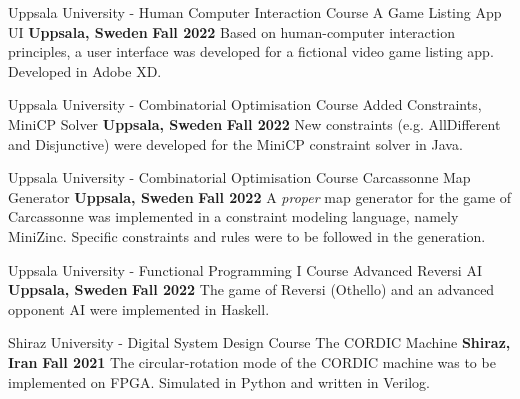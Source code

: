 

\begin{cventries}


  \cventry
    {Uppsala University - Human Computer Interaction Course} %
    {A Game Listing App UI} %
    {\textbf{Uppsala, Sweden}} %
    {\textbf{Fall 2022}} %
    {
        Based on human-computer interaction principles, a user interface was developed for a fictional video game listing app. Developed in Adobe XD.
    }

  \cventry
    {Uppsala University - Combinatorial Optimisation Course} %
    {Added Constraints, MiniCP Solver} %
    {\textbf{Uppsala, Sweden}} %
    {\textbf{Fall 2022}} %
    {
        New constraints (e.g. AllDifferent and Disjunctive) were developed for the MiniCP constraint solver in Java.
    }
    
  \cventry
    {Uppsala University - Combinatorial Optimisation Course} %
    {Carcassonne Map Generator} %
    {\textbf{Uppsala, Sweden}} %
    {\textbf{Fall 2022}} %
    {
        A \emph{proper} map generator for the game of Carcassonne was implemented in a constraint modeling language, namely MiniZinc. Specific constraints and rules were to be followed in the generation.
    }
    
  \cventry
    {Uppsala University - Functional Programming I Course} %
    {Advanced Reversi AI} %
    {\textbf{Uppsala, Sweden}} %
    {\textbf{Fall 2022}} %
    {
        The game of Reversi (Othello) and an advanced opponent AI were implemented in Haskell.
    }

  \cventry
    {Shiraz University - Digital System Design Course} %
    {The CORDIC Machine} %
    {\textbf{Shiraz, Iran}} %
    {\textbf{Fall 2021}} %
    {
      The circular-rotation mode of the CORDIC machine was to be implemented on FPGA. Simulated in Python and written in Verilog.
    }



\end{cventries}
